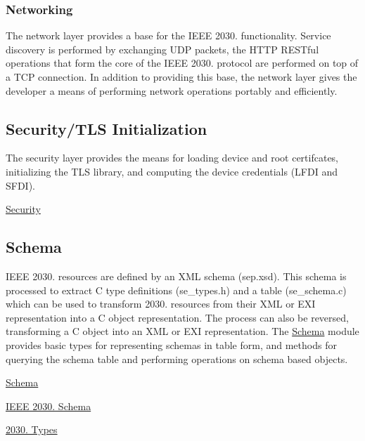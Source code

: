 \subsubsection*{Networking}

The network layer provides a base for the I\+E\+EE 2030. functionality. Service discovery is performed by exchanging U\+DP packets, the H\+T\+TP R\+E\+S\+Tful operations that form the core of the I\+E\+EE 2030. protocol are performed on top of a T\+CP connection. In addition to providing this base, the network layer gives the developer a means of performing network operations portably and efficiently.

\subsection*{Security/\+T\+LS Initialization }

The security layer provides the means for loading device and root certifcates, initializing the T\+LS library, and computing the device credentials (L\+F\+DI and S\+F\+DI).


\begin{DoxyItemize}
\item \hyperlink{group__security}{Security}
\end{DoxyItemize}

\subsection*{Schema }

I\+E\+EE 2030. resources are defined by an X\+ML schema (sep.\+xsd). This schema is processed to extract C type definitions (se\+\_\+types.\+h) and a table (se\+\_\+schema.\+c) which can be used to transform 2030. resources from their X\+ML or E\+XI representation into a C object representation. The process can also be reversed, transforming a C object into an X\+ML or E\+XI representation. The \hyperlink{group__schema}{Schema} module provides basic types for representing schemas in table form, and methods for querying the schema table and performing operations on schema based objects.


\begin{DoxyItemize}
\item \hyperlink{group__schema}{Schema}
\item \hyperlink{group__se__object}{I\+E\+EE 2030. Schema}
\item \hyperlink{group__se__types}{2030. Types}
\end{DoxyItemize}


